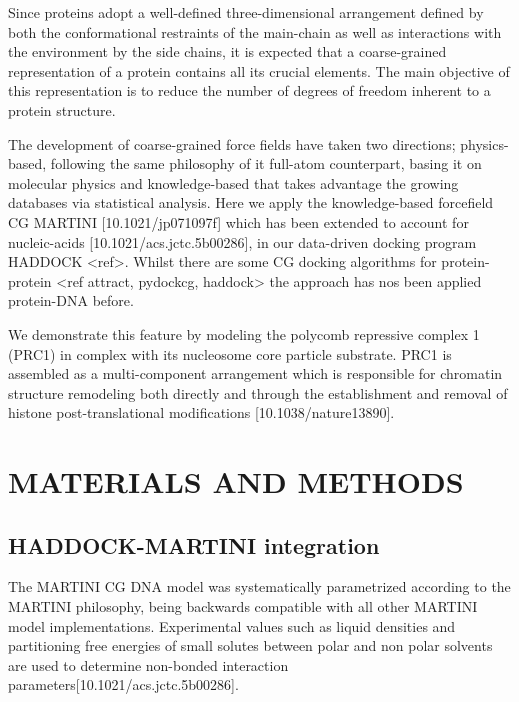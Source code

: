 \documentclass[a4,center,fleqn]{NAR}
\begin{document}
Since proteins adopt a well-defined three-dimensional arrangement defined by both the conformational restraints of the main-chain as well as interactions with the environment by the side chains, it is expected that a coarse-grained representation of a protein contains all its crucial elements. The main objective of this representation is to reduce the number of degrees of freedom inherent to a protein structure. 


The development of coarse-grained force fields have taken two directions; physics-based, following the same philosophy of it full-atom counterpart, basing it on molecular physics and knowledge-based that takes advantage the growing databases via statistical analysis. Here we apply the knowledge-based forcefield CG MARTINI [10.1021/jp071097f] which has been extended to account for nucleic-acids [10.1021/acs.jctc.5b00286], in our data-driven docking program HADDOCK <ref>. Whilst there are some CG docking algorithms for protein-protein <ref attract, pydockcg, haddock> the approach has nos been applied protein-DNA before.

We demonstrate this feature by modeling the polycomb repressive complex 1 (PRC1) in complex with its nucleosome core particle substrate. PRC1 is assembled as a multi-component arrangement which is responsible for chromatin structure remodeling both directly and through the establishment and removal of histone post-translational modifications [10.1038/nature13890].

\enlargethispage{-65.1pt}


\section{MATERIALS AND METHODS}

\subsection{HADDOCK-MARTINI integration}
The MARTINI CG DNA model was systematically parametrized according to the MARTINI philosophy, being backwards compatible with all other MARTINI model implementations. Experimental values such as liquid densities and partitioning free energies of small solutes between polar and non polar solvents are used to determine non-bonded interaction parameters[10.1021/acs.jctc.5b00286].
\end{document}
